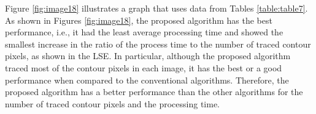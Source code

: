 
Figure \ref{fig:image18} illustrates a graph that uses data from Tables \ref{table:table7}. As shown in Figures \ref{fig:image18}, the proposed algorithm has the best performance, i.e., it had the least average processing time and showed the smallest increase in the ratio of the process time to the number of traced contour pixels, as shown in the LSE. In particular, although the proposed algorithm traced most of the contour pixels in each image, it has the best or a good performance when compared to the conventional algorithms. Therefore, the proposed algorithm has a better performance than the other algorithms for the number of traced contour pixels and the processing time. 




